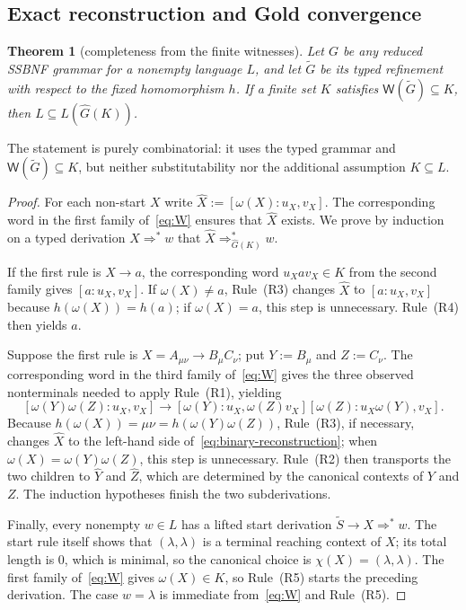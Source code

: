 \documentclass[11pt,a4paper]{article}
\newtheorem{theorem}{Theorem}[section]
\theoremstyle{remark}
\theoremstyle{plain}
\newcommand{\WitnessSet}{\mathsf{W}}
\begin{document}
\subsection{Exact reconstruction and Gold convergence}

\begin{theorem}[completeness from the finite witnesses]\label{thm:complete}
Let $G$ be any reduced SSBNF grammar for a nonempty language $L$, and let
$\widetilde G$ be its typed refinement with respect to the fixed
homomorphism $h$.  If a finite set $K$ satisfies
$\WitnessSet(\widetilde G)\subseteq K$, then $L\subseteq L(\widehat G(K))$.
\end{theorem}

The statement is purely combinatorial: it uses the typed grammar and
$\WitnessSet(\widetilde G)\subseteq K$, but neither substitutability nor the
additional assumption $K\subseteq L$.

\begin{proof}
For each non-start $X$ write $\widehat X:=[\omega(X):u_X,v_X]$.
The corresponding word in the first family of~\eqref{eq:W} ensures that
$\widehat X$ exists.  We prove
by induction on a typed derivation $X\Rightarrow^*w$ that
$\widehat X\Rightarrow_{\widehat G(K)}^*w$.

If the first rule is $X\to a$, the corresponding word
$u_Xav_X\in K$ from the second family gives
$[a:u_X,v_X]$.  If $\omega(X)\ne a$, Rule~(R3) changes $\widehat X$ to
$[a:u_X,v_X]$ because $h(\omega(X))=h(a)$; if $\omega(X)=a$, this step is
unnecessary.  Rule~(R4) then yields $a$.

Suppose the first rule is $X=A_{\mu\nu}\to B_\mu C_\nu$; put
$Y:=B_\mu$ and $Z:=C_\nu$.
The corresponding word in the third family of~\eqref{eq:W} gives the three
observed nonterminals
needed to apply Rule~(R1), yielding
\begin{equation}\label{eq:binary-reconstruction}
 [\omega(Y)\omega(Z):u_X,v_X]
 \to[\omega(Y):u_X,\omega(Z)v_X]
      [\omega(Z):u_X\omega(Y),v_X].
\end{equation}
Because $h(\omega(X))=\mu\nu=h(\omega(Y)\omega(Z))$, Rule~(R3), if
necessary, changes $\widehat X$ to the left-hand side
of~\eqref{eq:binary-reconstruction}; when $\omega(X)=\omega(Y)\omega(Z)$,
this step is unnecessary.  Rule~(R2) then transports
the two children to $\widehat Y$ and $\widehat Z$, which are determined by
the canonical contexts of $Y$ and $Z$.  The induction hypotheses finish the two subderivations.

Finally, every nonempty $w\in L$ has a lifted start derivation
$\widetilde S\to X\Rightarrow^*w$.  The start rule itself shows that
$(\lambda,\lambda)$ is a terminal reaching context of $X$; its total length is $0$,
which is minimal, so the canonical choice is
$\chi(X)=(\lambda,\lambda)$.  The first family of~\eqref{eq:W} gives $\omega(X)\in K$, so
Rule~(R5) starts the preceding derivation.  The case $w=\lambda$ is immediate
from~\eqref{eq:W} and Rule~(R5).
\end{proof}
\end{document}
